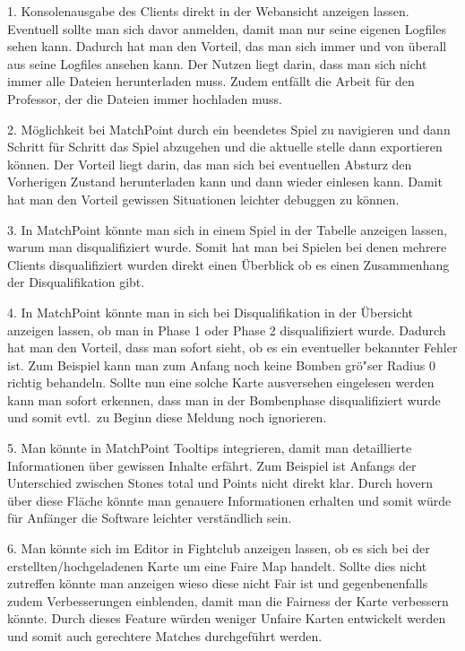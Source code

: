 1.
Konsolenausgabe des Clients direkt in der Webansicht anzeigen lassen.
Eventuell sollte man sich davor anmelden, damit man nur seine eigenen Logfiles sehen kann.
Dadurch hat man den Vorteil, das man sich immer und von \"uberall aus seine Logfiles ansehen kann.
Der Nutzen liegt darin, dass man sich nicht immer alle Dateien herunterladen muss.
Zudem entf\"allt die Arbeit f\"ur den Professor, der die Dateien immer hochladen muss.

2.
M\"oglichkeit bei MatchPoint durch ein beendetes Spiel zu navigieren und dann Schritt f\"ur Schritt das Spiel abzugehen und die aktuelle stelle dann exportieren k\"onnen.
Der Vorteil liegt darin, das man sich bei eventuellen Absturz den Vorherigen Zustand herunterladen kann und dann wieder einlesen kann.
Damit hat man den Vorteil gewissen Situationen leichter debuggen zu k\"onnen.

3.
In MatchPoint k\"onnte man sich in einem Spiel in der Tabelle anzeigen lassen, warum man disqualifiziert wurde.
Somit hat man bei Spielen bei denen mehrere Clients disqualifiziert wurden direkt einen \"Uberblick ob es einen Zusammenhang der Disqualifikation gibt.

4.
In MatchPoint k\"onnte man in sich bei Disqualifikation in der \"Ubersicht anzeigen lassen, ob man in Phase 1 oder Phase 2 disqualifiziert wurde.
Dadurch hat man den Vorteil, dass man sofort sieht, ob es ein eventueller bekannter Fehler ist.
Zum Beispiel kann man zum Anfang noch keine Bomben gr\"o"ser Radius 0 richtig behandeln.
Sollte nun eine solche Karte ausversehen eingelesen werden kann man sofort erkennen, dass man in der Bombenphase disqualifiziert wurde und somit evtl.\ zu Beginn diese Meldung noch ignorieren.

5.
Man k\"onnte in MatchPoint Tooltips integrieren, damit man detaillierte Informationen \"uber gewissen Inhalte erf\"ahrt.
Zum Beispiel ist Anfangs der Unterschied zwischen Stones total und Points nicht direkt klar.
Durch hovern \"uber diese Fl\"ache k\"onnte man genauere Informationen erhalten und somit w\"urde f\"ur Anf\"anger die Software leichter verst\"andlich sein.

6.
Man k\"onnte sich im Editor in Fightclub anzeigen lassen, ob es sich bei der erstellten/hochgeladenen Karte um eine Faire Map handelt.
Sollte dies nicht zutreffen k\"onnte man anzeigen wieso diese nicht Fair ist und gegenbenenfalls zudem Verbesserungen einblenden, damit man die Fairness der Karte verbessern k\"onnte.
Durch dieses Feature w\"urden weniger Unfaire Karten entwickelt werden und somit auch gerechtere Matches durchgef\"uhrt werden.